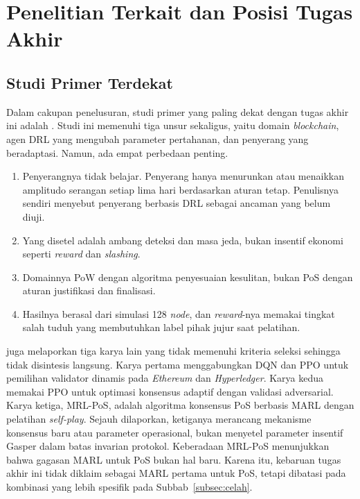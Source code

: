 \section{Penelitian Terkait dan Posisi Tugas Akhir}
\label{sec:penelitian_terkait}

\subsection{Studi Primer Terdekat}
\label{subsec:studi_terdekat}
Dalam cakupan penelusuran, studi primer yang paling dekat dengan tugas akhir ini adalah \textcite{skowronski2026adaptive}. Studi ini memenuhi tiga unsur sekaligus, yaitu domain \textit{blockchain}, agen DRL yang mengubah parameter pertahanan, dan penyerang yang beradaptasi. Namun, ada empat perbedaan penting.
\begin{enumerate}
	\item Penyerangnya tidak belajar. Penyerang hanya menurunkan atau menaikkan amplitudo serangan setiap lima hari berdasarkan aturan tetap. Penulisnya sendiri menyebut penyerang berbasis DRL sebagai ancaman yang belum diuji.
	\item Yang disetel adalah ambang deteksi dan masa jeda, bukan insentif ekonomi seperti \textit{reward} dan \textit{slashing}.
	\item Domainnya PoW dengan algoritma penyesuaian kesulitan, bukan PoS dengan aturan justifikasi dan finalisasi.
	\item Hasilnya berasal dari simulasi 128 \textit{node}, dan \textit{reward}-nya memakai tingkat salah tuduh yang membutuhkan label pihak jujur saat pelatihan.
\end{enumerate}

\textcite{skowronski2026adaptive} juga melaporkan tiga karya lain yang tidak memenuhi kriteria seleksi sehingga tidak disintesis langsung. Karya pertama menggabungkan DQN dan PPO untuk pemilihan validator dinamis pada \textit{Ethereum} dan \textit{Hyperledger}. Karya kedua memakai PPO untuk optimasi konsensus adaptif dengan validasi adversarial. Karya ketiga, MRL-PoS, adalah algoritma konsensus PoS berbasis MARL dengan pelatihan \textit{self-play}. Sejauh dilaporkan, ketiganya merancang mekanisme konsensus baru atau parameter operasional, bukan menyetel parameter insentif Gasper dalam batas invarian protokol. Keberadaan MRL-PoS menunjukkan bahwa gagasan MARL untuk PoS bukan hal baru. Karena itu, kebaruan tugas akhir ini tidak diklaim sebagai MARL pertama untuk PoS, tetapi dibatasi pada kombinasi yang lebih spesifik pada Subbab~\ref{subsec:celah}.

